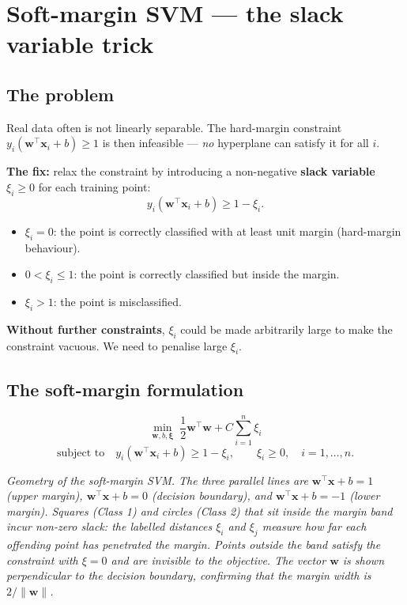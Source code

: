 \documentclass[11pt, a4paper]{article}
\begin{document}
\section{Soft-margin SVM --- the slack variable trick}

\subsection{The problem}

Real data often is not linearly separable. The hard-margin constraint $y_i(\mathbf{w}^\top\mathbf{x}_i + b) \ge 1$ is then infeasible — \emph{no} hyperplane can satisfy it for all $i$.

\textbf{The fix:} relax the constraint by introducing a non-negative \textbf{slack variable} $\xi_i \ge 0$ for each training point:
\[
y_i(\mathbf{w}^\top\mathbf{x}_i + b) \ge 1 - \xi_i.
\]
\begin{itemize}
  \item $\xi_i = 0$: the point is correctly classified with at least unit margin (hard-margin behaviour).
  \item $0 < \xi_i \le 1$: the point is correctly classified but inside the margin.
  \item $\xi_i > 1$: the point is misclassified.
\end{itemize}

\textbf{Without further constraints}, $\xi_i$ could be made arbitrarily large to make the constraint vacuous. We need to penalise large $\xi_i$.

\subsection{The soft-margin formulation}

\begin{defbox}
\[
\min_{\mathbf{w}, b, \boldsymbol\xi}\;\frac{1}{2}\mathbf{w}^\top\mathbf{w} + C\sum_{i=1}^n \xi_i
\]
\[
\text{subject to}\quad y_i(\mathbf{w}^\top\mathbf{x}_i + b) \ge 1 - \xi_i, \qquad \xi_i \ge 0, \quad i = 1, \ldots, n.
\]
\end{defbox}

\begin{center}

\footnotesize\textit{Geometry of the soft-margin SVM. The three parallel lines are $\mathbf{w}^\top\mathbf{x}+b = 1$ (upper margin), $\mathbf{w}^\top\mathbf{x}+b = 0$ (decision boundary), and $\mathbf{w}^\top\mathbf{x}+b = -1$ (lower margin). Squares (Class 1) and circles (Class 2) that sit \emph{inside} the margin band incur non-zero slack: the labelled distances $\xi_i$ and $\xi_j$ measure how far each offending point has penetrated the margin. Points outside the band satisfy the constraint with $\xi = 0$ and are invisible to the objective. The vector $\mathbf{w}$ is shown perpendicular to the decision boundary, confirming that the margin width is $2/\|\mathbf{w}\|$.}
\end{center}
\end{document}
